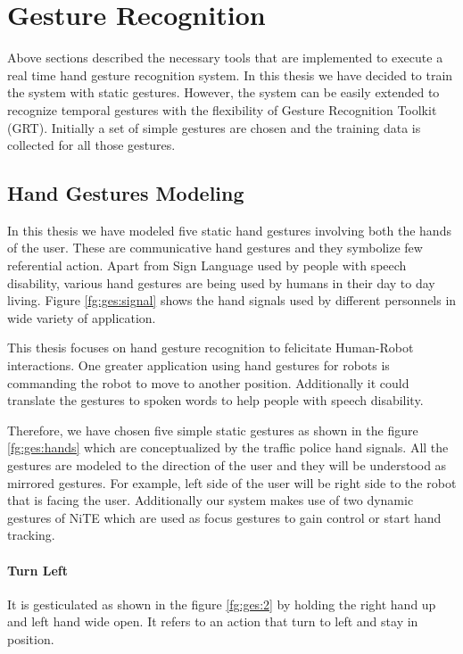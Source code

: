 \section{Gesture Recognition}
Above sections described the necessary tools that are implemented to execute a real time hand gesture recognition system. In this thesis we have decided to train the system with static gestures. However, the system can be easily extended to recognize temporal gestures with the flexibility of Gesture Recognition Toolkit (GRT). Initially a set of simple gestures are chosen and the training data is collected for all those gestures.

\subsection{Hand Gestures Modeling}
In this thesis we have modeled five static hand gestures involving both the hands of the user. These are communicative hand gestures and they symbolize few referential action. Apart from Sign Language used by people with speech disability, various hand gestures are being used by humans in their day to day living. Figure \ref{fg:ges:signal} shows the hand signals used by different personnels in wide variety of application.



This thesis focuses on hand gesture recognition to felicitate Human-Robot interactions. One greater application using hand gestures for robots is commanding the robot to move to another position. Additionally it could translate the gestures to spoken words to help people with speech disability.   



Therefore, we have chosen five simple static gestures as shown in the figure \ref{fg:ges:hands} which are conceptualized by the traffic police hand signals. All the gestures are modeled to the direction of the user and they will be understood as mirrored gestures. For example, left side of the user will be right side to the robot that is facing the user. Additionally our system makes use of two dynamic gestures of NiTE which are used as focus gestures to gain control or start hand tracking.

\paragraph*{Turn Left} It is gesticulated as shown in the figure \ref{fg:ges:2} by holding the right hand up and left hand wide open. It refers to an action that turn to left and stay in position. 

